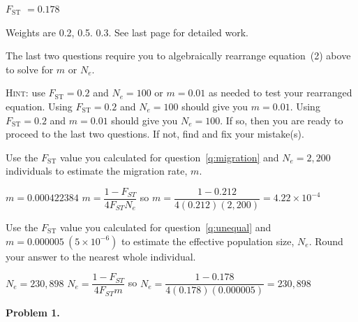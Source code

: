 \documentclass[12pt, addpoints, hidelinks]{exam}
\newcommand{\fst}{$F_{\mathrm{ST}}$}
\begin{document}
\begin{questions}
\begin{multicols}{2}
\columnbreak

\ifprintanswers 



\fst{} $= 0.178$ \else \phantom{\fst{} $= 0.178$} \fi

Weights are 0.2, 0.5. 0.3. See last page for detailed work.

\end{multicols}
	
\newpage

The last two questions require you to algebraically rearrange equation~(2) above to solve for $m$ or $N_e$.

\textsc{Hint:} use $F_\mathrm{ST} = 0.2$ and $N_e = 100$ or $m = 0.01$ as needed to test your rearranged equation. Using $F_\mathrm{ST} = 0.2$ and $N_e = 100$ should give you $m = 0.01$. Using $F_\mathrm{ST} = 0.2$ and $m = 0.01$ should give you $N_e = 100$. If so, then you are ready to proceed to the last two questions. If not, find and fix your mistake(s).

\question[4]
Use the \fst{} value you calculated for question~\ref{q:migration} and $N_e = 2,200$ individuals to estimate the migration rate, $m$. 

\ifprintanswers 
	$m = 0.000422384$  \hfill $m = \dfrac{1-F_{ST}}{4F_{ST}N_e}$ \hspace{1em} so \hspace{1em} $m = \dfrac{1 - 0.212}{4(0.212)(2,200)} = 4.22 \times 10^{-4}$
	
	\vspace{2\baselineskip} 
\else 
	\vspace{3\baselineskip}
\fi

\question[4]
Use the \fst{} value you calculated for question~\ref{q:unequal} and $m = 0.000005\ (5\times 10^{-6})$ to estimate the effective population size, $N_e$. Round your answer to the nearest whole individual.

\ifprintanswers 
	$N_e = 230,898$ \hfill $N_e = \dfrac{1-F_{ST}}{4F_{ST}m}$ \quad so \quad $N_e = \dfrac{1 - 0.178}{4(0.178)(0.000005)} = 230,898$

	
	\vspace{\baselineskip}
\else 
	\vspace{2\baselineskip} 
\fi

\ifprintanswers

\newpage

\begin{multicols}{2}

\textbf{Problem 1.}


\end{multicols}
\end{questions}
\end{document}
